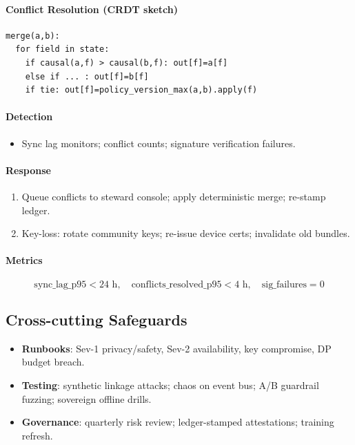 \documentclass[11pt]{article}
\theoremstyle{plain}
\begin{document}
\paragraph{Conflict Resolution (CRDT sketch)}
\begin{verbatim}
merge(a,b):
  for field in state:
    if causal(a,f) > causal(b,f): out[f]=a[f]
    else if ... : out[f]=b[f]
    if tie: out[f]=policy_version_max(a,b).apply(f)
\end{verbatim}

\paragraph{Detection}
\begin{itemize}
  \item Sync lag monitors; conflict counts; signature verification failures.
\end{itemize}

\paragraph{Response}
\begin{enumerate}
  \item Queue conflicts to steward console; apply deterministic merge; re-stamp ledger.
  \item Key-loss: rotate community keys; re-issue device certs; invalidate old bundles.
\end{enumerate}

\paragraph{Metrics}
\[
\text{sync\_lag\_p95} < 24\text{ h},\quad \text{conflicts\_resolved\_p95} < 4\text{ h},\quad
\text{sig\_failures}=0
\]

\subsection{Cross-cutting Safeguards}
\begin{itemize}
  \item \textbf{Runbooks}: Sev-1 privacy/safety, Sev-2 availability, key compromise, DP budget breach.
  \item \textbf{Testing}: synthetic linkage attacks; chaos on event bus; A/B guardrail fuzzing; sovereign offline drills.
  \item \textbf{Governance}: quarterly risk review; ledger-stamped attestations; training refresh.
\end{itemize}
\end{document}
